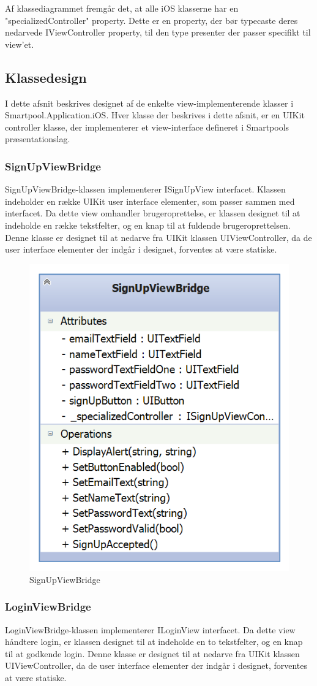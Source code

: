 Af klassediagrammet fremgår det, at alle iOS klasserne har en "specializedController" property. Dette er en property, der bør typecaste deres nedarvede IViewController property, til den type presenter der passer specifikt til view'et.

\subsection{Klassedesign}
I dette afsnit beskrives designet af de enkelte view-implementerende klasser i Smartpool.Application.iOS. Hver klasse der beskrives i dette afsnit, er en UIKit controller klasse, der implementerer et view-interface defineret i Smartpools præsentationslag.

\subsubsection{SignUpViewBridge}
SignUpViewBridge-klassen implementerer ISignUpView interfacet. Klassen indeholder en række UIKit user interface elementer, som passer sammen med interfacet. Da dette view omhandler brugeroprettelse, er klassen designet til at indeholde en række tekstfelter, og en knap til at fuldende brugeroprettelsen. Denne klasse er designet til at nedarve fra UIKit klassen UIViewController, da de user interface elementer der indgår i designet, forventes at være statiske.

\begin{figure}
	\centering
	\includegraphics[width=0.3\linewidth]{figs/design/ios_signupviewbridge}
	\caption{SignUpViewBridge}
	\label{fig:ios_signupviewbridge}
\end{figure}

\subsubsection{LoginViewBridge}
LoginViewBridge-klassen implementerer ILoginView interfacet. Da dette view håndtere login, er klassen designet til at indeholde en to tekstfelter, og en knap til at godkende login. Denne klasse er designet til at nedarve fra UIKit klassen UIViewController, da de user interface elementer der indgår i designet, forventes at være statiske.

